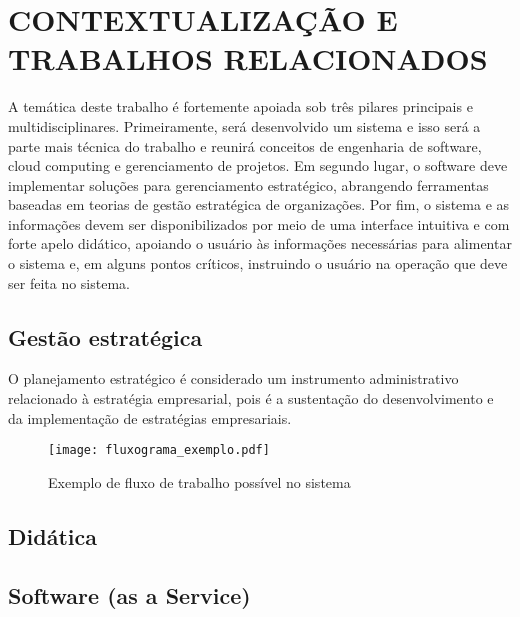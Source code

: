 \documentclass{abnt}
\begin{document}
\chapter{CONTEXTUALIZAÇÃO E TRABALHOS RELACIONADOS}

A temática deste trabalho é fortemente apoiada sob três pilares principais e
multidisciplinares. Primeiramente, será desenvolvido um sistema e isso será a
parte mais técnica do trabalho e reunirá conceitos de engenharia de software,
cloud computing e gerenciamento de projetos. Em segundo lugar, o software deve
implementar soluções para gerenciamento estratégico, abrangendo ferramentas
baseadas em teorias de gestão estratégica de organizações. Por fim, o sistema e
as informações devem ser disponibilizados por meio de uma interface intuitiva e
com forte apelo didático, apoiando o usuário às informações necessárias para
alimentar o sistema e, em alguns pontos críticos, instruindo o usuário na
operação que deve ser feita no sistema.

\section{Gestão estratégica}


O planejamento estratégico é considerado um instrumento administrativo
relacionado à estratégia empresarial, pois é a sustentação do desenvolvimento e
da implementação de estratégias empresariais\cite{OLIVEIRA1991}.


\begin{figure}[!htb]
	\centering
	\texttt{[image: fluxograma\_exemplo.pdf]}
	\caption{Exemplo de fluxo de trabalho possível no sistema}
	\label{Rotulo}
\end{figure}

\section{Didática}


\section{Software (as a Service)}
\end{document}
